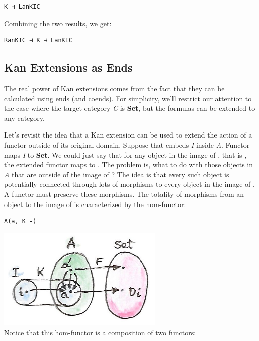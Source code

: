 \begin{verbatim}
K ⊣ LanKIC
\end{verbatim}

Combining the two results, we get:

\begin{verbatim}
RanKIC ⊣ K ⊣ LanKIC
\end{verbatim}

\subsection{Kan Extensions as Ends}\label{kan-extensions-as-ends}

The real power of Kan extensions comes from the fact that they can be
calculated using ends (and coends). For simplicity, we'll restrict our
attention to the case where the target category \emph{C} is
\textbf{Set}, but the formulas can be extended to any category.

Let's revisit the idea that a Kan extension can be used to extend the
action of a functor outside of its original domain. Suppose that
 embeds \emph{I} inside \emph{A}. Functor  maps
\emph{I} to \textbf{Set}. We could just say that for any object
 in the image of , that is , the
extended functor maps  to . The problem is, what
to do with those objects in \emph{A} that are outside of the image of
? The idea is that every such object is potentially connected
through lots of morphisms to every object in the image of . A
functor must preserve these morphisms. The totality of morphisms from an
object  to the image of  is characterized by the
hom-functor:

\begin{verbatim}
A(a, K -)
\end{verbatim}

\includegraphics[width=3.12500in]{images/kan13.jpg}\\
Notice that this hom-functor is a composition of two functors:

